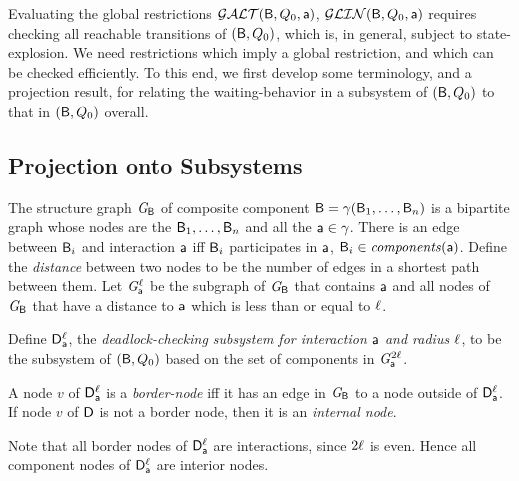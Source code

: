 
   \label{s:local.preamble}
%   

Evaluating the global restrictions $\mathcal{GALT}(\mathsf{B},Q_0,\mathsf{a})$, $\mathcal{GLIN}(\mathsf{B},Q_0,\mathsf{a})$ requires checking all reachable transitions of
$(\mathsf{B}, Q_0)$, which is, in general, subject to state-explosion.
We need restrictions which imply a global restriction, 
and which can be checked efficiently.
%
To this end, we first develop some terminology, and a projection result, for relating the waiting-behavior in a
subsystem of $(\mathsf{B},Q_0)$ to that in $(\mathsf{B},Q_0)$ overall.



\subsection{Projection onto Subsystems}
\label{s:projection}

\begin{definition} \label{def:structure-graph} The structure
graph $\mathit{G}_{\mathsf{B}}$ of composite component $\mathsf{B} = \gamma(\mathsf{B}_1,\dots,\mathsf{B}_n)$ is a
bipartite graph whose nodes are the $\mathsf{B}_1, \ldots, \mathsf{B}_n$ and all the
$\mathsf{a} \in \gamma$.  There is an edge between $\mathsf{B}_i$ and
interaction $\mathsf{a}$ iff $\mathsf{B}_i$ participates in $\mathsf{a}$, \ie $\mathsf{B}_i \in \mathit{components}(\mathsf{a})$.  Define the
\emph{distance} between two nodes to be the number of edges in a shortest path
between them.  Let $\mathit{G}_{\mathsf{a}}^{\ell}$ be the subgraph
of $\mathit{G}_{\mathsf{B}}$ that contains $\mathsf{a}$ and all nodes of $\mathit{G}_{\mathsf{B}}$
that have a distance to $\mathsf{a}$ which is less than or equal to $\ell$.
\end{definition}


\begin{definition} \label{def:dsk}
Define $\mathsf{D}_{\mathsf{a}}^{\ell}$, the \emph{deadlock-checking subsystem for interaction $\mathsf{a}$ and
radius $\ell$}, to be the subsystem of $(\mathsf{B}, Q_0)$ based on the set of %
components in $\mathit{G}_{\mathsf{a}}^{2\ell}$.  %
\end{definition}

\begin{definition}  \label{def:dsk.border-and internal}
A node $v$ of $\mathsf{D}_{\mathsf{a}}^{\ell}$ is a \emph{border-node} iff it has an
edge in $\mathit{G}_{\mathsf{B}}$ to a node outside of $\mathsf{D}_{\mathsf{a}}^{\ell}$.
If node $v$ of $\mathsf{D}$ is not a border node, then it is an \emph{internal node}.
\end{definition}
Note that all border nodes of  $\mathsf{D}_{\mathsf{a}}^{\ell}$ are interactions,
since $2\ell$ is even. Hence all component nodes of $\mathsf{D}_{\mathsf{a}}^{\ell}$ are
interior nodes.


